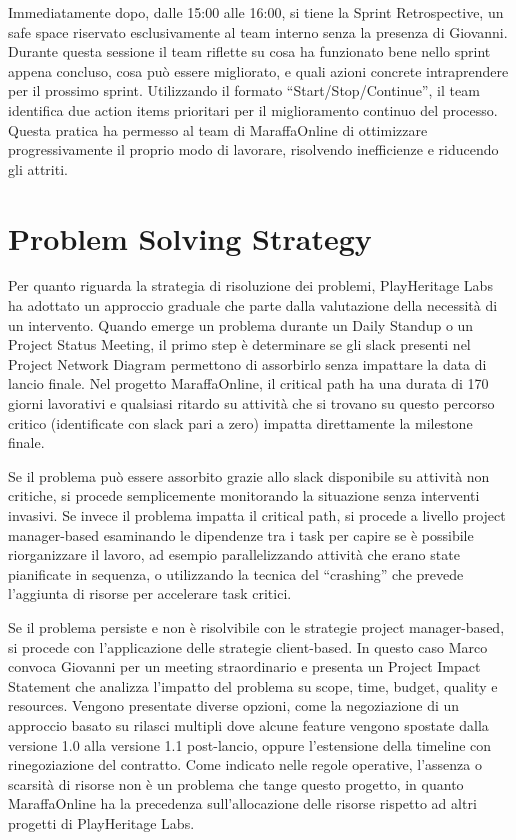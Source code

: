 Immediatamente dopo, dalle 15:00 alle 16:00, si tiene la Sprint Retrospective, un safe space riservato esclusivamente al team interno senza la presenza di Giovanni. Durante questa sessione il team riflette su cosa ha funzionato bene nello sprint appena concluso, cosa può essere migliorato, e quali azioni concrete intraprendere per il prossimo sprint. Utilizzando il formato ``Start/Stop/Continue'', il team identifica due action items prioritari per il miglioramento continuo del processo. Questa pratica ha permesso al team di MaraffaOnline di ottimizzare progressivamente il proprio modo di lavorare, risolvendo inefficienze e riducendo gli attriti.

\section{Problem Solving Strategy}

Per quanto riguarda la strategia di risoluzione dei problemi, PlayHeritage Labs ha adottato un approccio graduale che parte dalla valutazione della necessità di un intervento. Quando emerge un problema durante un Daily Standup o un Project Status Meeting, il primo step è determinare se gli slack presenti nel Project Network Diagram permettono di assorbirlo senza impattare la data di lancio finale. Nel progetto MaraffaOnline, il critical path ha una durata di 170 giorni lavorativi e qualsiasi ritardo su attività che si trovano su questo percorso critico (identificate con slack pari a zero) impatta direttamente la milestone finale.

Se il problema può essere assorbito grazie allo slack disponibile su attività non critiche, si procede semplicemente monitorando la situazione senza interventi invasivi. Se invece il problema impatta il critical path, si procede a livello project manager-based esaminando le dipendenze tra i task per capire se è possibile riorganizzare il lavoro, ad esempio parallelizzando attività che erano state pianificate in sequenza, o utilizzando la tecnica del ``crashing'' che prevede l'aggiunta di risorse per accelerare task critici.

Se il problema persiste e non è risolvibile con le strategie project manager-based, si procede con l'applicazione delle strategie client-based. In questo caso Marco convoca Giovanni per un meeting straordinario e presenta un Project Impact Statement che analizza l'impatto del problema su scope, time, budget, quality e resources. Vengono presentate diverse opzioni, come la negoziazione di un approccio basato su rilasci multipli dove alcune feature vengono spostate dalla versione 1.0 alla versione 1.1 post-lancio, oppure l'estensione della timeline con rinegoziazione del contratto. Come indicato nelle regole operative, l'assenza o scarsità di risorse non è un problema che tange questo progetto, in quanto MaraffaOnline ha la precedenza sull'allocazione delle risorse rispetto ad altri progetti di PlayHeritage Labs.


